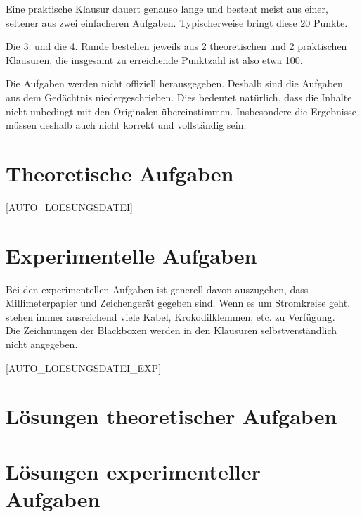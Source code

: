 Eine praktische Klausur dauert genauso lange und besteht meist aus einer, seltener aus zwei einfacheren Aufgaben. Typischerweise bringt diese 20 Punkte.

Die 3. und die 4. Runde bestehen jeweils aus 2 theoretischen und 2 praktischen Klausuren, die insgesamt zu erreichende Punktzahl ist also etwa 100.

Die Aufgaben werden nicht offiziell herausgegeben. Deshalb sind die Aufgaben aus dem Gedächtnis niedergeschrieben. Dies bedeutet natürlich, dass die Inhalte nicht unbedingt mit den Originalen übereinstimmen. Insbesondere die Ergebnisse müssen deshalb auch nicht korrekt und vollständig sein.

\section{Theoretische Aufgaben}

[AUTO_LOESUNGSDATEI]






















\section{Experimentelle Aufgaben}

Bei den experimentellen Aufgaben ist generell davon auszugehen, dass Millimeterpapier und Zeichengerät gegeben sind. Wenn es um Stromkreise geht, stehen immer ausreichend viele Kabel, Krokodilklemmen, etc. zu Verfügung.\\
Die Zeichnungen der Blackboxen werden in den Klausuren selbstverständlich nicht angegeben.

[AUTO_LOESUNGSDATEI_EXP]






\section{Lösungen theoretischer Aufgaben}


\section{Lösungen experimenteller Aufgaben}



\endinput
